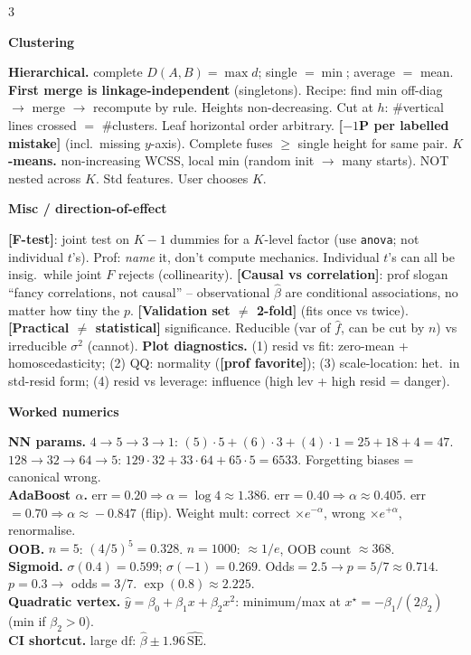 \documentclass[a4paper,8pt]{extarticle}
\renewcommand{\section}[1]{\par\vspace{2pt}\noindent\colorbox{black!15}{\parbox{0.97\linewidth}{\strut\bfseries\small #1}}\par\vspace{1pt}}
\newcommand{\hd}[1]{\textbf{#1.}}
\newcommand{\tr}[1]{\textcolor{red!70!black}{\textbf{[#1]}}} %
\newcommand{\df}{\mathrm{df}}
\begin{document}
\begin{multicols*}{3}
\section{Clustering}
\hd{Hierarchical} complete $D(A,B)=\max d$; single $=\min$; average $=$ mean. \textbf{First merge is linkage-independent} (singletons). Recipe: find min off-diag $\to$ merge $\to$ recompute by rule. Heights non-decreasing. Cut at $h$: \#vertical lines crossed $=$ \#clusters. Leaf horizontal order arbitrary. \tr{$-1$P per labelled mistake} (incl.\ missing $y$-axis). Complete fuses $\ge$ single height for same pair.
\hd{$K$-means} non-increasing WCSS, local min (random init $\to$ many starts). NOT nested across $K$. Std features. User chooses $K$.

\section{Misc / direction-of-effect}
\tr{F-test}: joint test on $K-1$ dummies for a $K$-level factor (use \texttt{anova}; not individual $t$'s). Prof: \emph{name} it, don't compute mechanics. Individual $t$'s can all be insig.\ while joint $F$ rejects (collinearity).
\tr{Causal vs correlation}: prof slogan ``fancy correlations, not causal'' -- observational $\hat\beta$ are conditional associations, no matter how tiny the $p$.
\tr{Validation set $\ne$ 2-fold} (fits once vs twice).
\tr{Practical $\ne$ statistical} significance.
Reducible (var of $\hat f$, can be cut by $n$) vs irreducible $\sigma^2$ (cannot).
\hd{Plot diagnostics} (1) resid vs fit: zero-mean + homoscedasticity; (2) QQ: normality (\tr{prof favorite}); (3) scale-location: het.\ in std-resid form; (4) resid vs leverage: influence (high lev + high resid = danger).

\columnbreak

\section{Worked numerics}
\hd{NN params} $4{\to}5{\to}3{\to}1$: $(5){\cdot}5+(6){\cdot}3+(4){\cdot}1=25{+}18{+}4=47$. \quad $128{\to}32{\to}64{\to}5$: $129{\cdot}32+33{\cdot}64+65{\cdot}5=6533$. Forgetting biases = canonical wrong.\\
\hd{AdaBoost $\alpha$} err$=0.20\Rightarrow\alpha=\log4\!\approx\!1.386$. err$=0.40\Rightarrow\alpha\!\approx\!0.405$. err$=0.70\Rightarrow\alpha\!\approx\!-0.847$ (flip). Weight mult: correct $\times e^{-\alpha}$, wrong $\times e^{+\alpha}$, renormalise.\\
\hd{OOB} $n{=}5$: $(4/5)^5{=}0.328$. $n{=}1000$: $\approx 1/e$, OOB count $\approx 368$.\\
\hd{Sigmoid} $\sigma(0.4)\!=\!0.599$; $\sigma(-1)\!=\!0.269$. Odds$=2.5\to p=5/7\!\approx\!0.714$. $p=0.3\to$ odds$=3/7$. $\exp(0.8)\!\approx\!2.225$.\\
\hd{Quadratic vertex} $\hat y=\beta_0+\beta_1 x+\beta_2 x^2$: minimum/max at $x^\star=-\beta_1/(2\beta_2)$ (min if $\beta_2{>}0$).\\
\hd{CI shortcut} large $\df$: $\hat\beta\pm 1.96\,\widehat{\text{SE}}$.


\end{multicols*}
\end{document}

